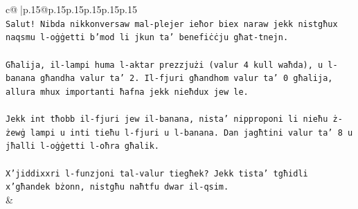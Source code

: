 \documentclass{article}
\begin{document}
{\begin{supertabular}{c@{$\;$}|p{.15\linewidth}@{}p{.15\linewidth}p{.15\linewidth}p{.15\linewidth}p{.15\linewidth}p{.15\linewidth}}
{{{\\ 
\texttt{Salut! Nibda nikkonversaw mal{-}plejer ieħor biex naraw jekk nistgħux naqsmu l{-}oġġetti b'mod li jkun ta' benefiċċju għat{-}tnejn.} \\
\\ 
\texttt{Għalija, il{-}lampi huma l{-}aktar prezzjużi (valur 4 kull waħda), u l{-}banana għandha valur ta' 2. Il{-}fjuri għandhom valur ta' 0 għalija, allura mhux importanti ħafna jekk nieħdux jew le.} \\
\\ 
\texttt{Jekk int tħobb il{-}fjuri jew il{-}banana, nista' nipproponi li nieħu ż{-}żewġ lampi u inti tieħu l{-}fjuri u l{-}banana. Dan jagħtini valur ta' 8 u jħalli l{-}oġġetti l{-}oħra għalik.} \\
\\ 
\texttt{X'jiddixxri l{-}funzjoni tal{-}valur tiegħek? Jekk tista' tgħidli x'għandek bżonn, nistgħu naħtfu dwar il{-}qsim.} \\
            }
        }
    }
    & \\ \\


\end{supertabular}}
\end{document}
